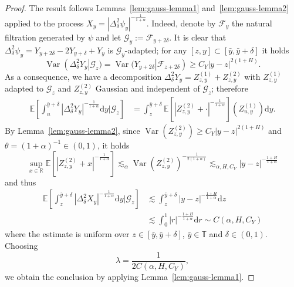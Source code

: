 \documentclass[11pt,oneside,reqno]{amsart}
\newcommand{\assign}{:=}
\newcommand{\mathd}{\mathrm{d}}
\newcommand{\tmop}[1]{\ensuremath{\operatorname{#1}}}
\numberwithin{equation}{section}
\begin{document}
\begin{proof}
  The result follows Lemmas~\ref{lem:gauss-lemma1} and~\ref{lem:gauss-lemma2}
  applied to the process $X_y = | \Delta^2_{\delta} \psi_y |^{- \frac{1}{1 +
  \alpha}}$. Indeed, denote by $\mathcal{F}_y$ the natural filtration
  generated by $\psi$ and let $\mathcal{G}_y \assign \mathcal{F}_{y + 2
  \delta}$. It is clear that $\Delta^2_{\delta} \psi_y = Y_{y + 2 \delta} - 2
  Y_{y + \delta} + Y_y$ is $\mathcal{G}_y$-adapted; for any $[z, y] \subset
  [\bar{y}, \bar{y} + \delta]$ it holds
  \[ \tmop{Var} (\Delta^2_{\delta} Y_y | \mathcal{G}_z) = \tmop{Var} (Y_{y + 2
     \delta} | \mathcal{F}_{z + 2 \delta}) \geqslant C_Y | y - z |^{2 (1 + H)}
     . \]
  As a consequence, we have a decomposition $\Delta^2_{\delta} Y_y =
  Z^{(1)}_{z, y} + Z^{(2)}_{z, y}$ with $Z^{(1)}_{z, y}$ adapted to
  $\mathcal{G}_z$ and $Z^{(2)}_{z, y}$ Gaussian and independent of
  $\mathcal{G}_z$; therefore
%  
  \begin{align*}
    \mathbb{E} \left[ \int_u^{\bar{y} + \delta} | \Delta^2_{\delta} Y_y |^{-
    \frac{1}{1 + \alpha}} \mathd y | \mathcal{G}_z \right] & = \int_z^{\bar{y}
    + \delta} \mathbb{E} \left[ | Z^{(2)}_{z, y} + \cdot |^{- \frac{1}{1 +
    \alpha}} \right] (Z^{(1)}_{u, y}) \mathd y.
  \end{align*}
%  
  By Lemma~\ref{lem:gauss-lemma2}, since $\tmop{Var} (Z^{(2)}_{z, y})
  \geqslant C_Y {| y - z |^{2 (1 + H)}} $ and $\theta = (1 + \alpha)^{- 1} \in
  (0, 1)$, it holds
  \[ \sup_{x \in \mathbb{R}} \mathbb{E} \left[ | Z^{(2)}_{z, y} + x |^{-
     \frac{1}{1 + \alpha}} \right] \lesssim_{\alpha} \tmop{Var} (Z^{(2)}_{z,
     y})^{- \frac{1}{2 (1 + \alpha)}} \lesssim_{\alpha, H, C_Y} | y - z |^{-
     \frac{1 + H}{1 + \alpha}} \]
  and thus
%  
  \begin{align*}
    \mathbb{E} \left[ \int_z^{\bar{y} + \delta} | \Delta^2_{\delta} X_y |^{-
    \frac{1}{1 + \alpha}} \mathd y | \mathcal{G}_z \right] & \lesssim
    \int_z^{\bar{y} + \delta} | y - z |^{- \frac{1 + H}{1 + \alpha}} \mathd
    z\\
    & \lesssim \int_0^1 | r |^{- \frac{1 + H}{1 + \alpha}} \mathd r \sim C
    (\alpha, H, C_Y)
  \end{align*}
%  
  where the estimate is uniform over $z \in [\bar{y}, \bar{y} + \delta]$,
  $\bar{y} \in \mathbb{T}$ and $\delta \in (0, 1)$. Choosing
  \[ \lambda = \frac{1}{2 C (\alpha, H, C_Y)}, \]
  we obtain the conclusion by applying Lemma~\ref{lem:gauss-lemma1}.
\end{proof}
\end{document}
